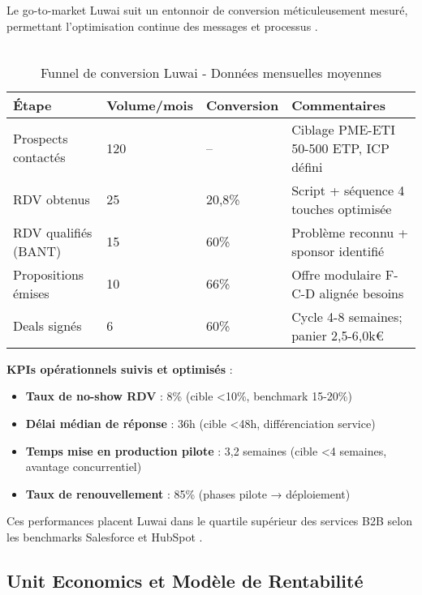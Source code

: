 Le go-to-market Luwai suit un entonnoir de conversion méticuleusement mesuré, permettant l'optimisation continue des messages et processus \cite{luwai2025funnel}.
\\\\
\begin{table}[ht]
\centering
\caption{Funnel de conversion Luwai - Données mensuelles moyennes}
\label{tab:luwai_funnel}
\begin{tabular}{@{}p{5cm}p{3cm}p{3cm}p{4cm}@{}}
\toprule
\textbf{Étape} & \textbf{Volume/mois} & \textbf{Conversion} & \textbf{Commentaires} \\
\midrule
Prospects contactés & 120 & -- & Ciblage PME-ETI 50-500 ETP, ICP défini \\
RDV obtenus & 25 & 20,8\% & Script + séquence 4 touches optimisée \\
RDV qualifiés (BANT) & 15 & 60\% & Problème reconnu + sponsor identifié \\
Propositions émises & 10 & 66\% & Offre modulaire F-C-D alignée besoins \\
Deals signés & 6 & 60\% & Cycle 4-8 semaines; panier 2,5-6,0k€ \\
\bottomrule
\end{tabular}
\end{table}
\medskip
\textbf{KPIs opérationnels suivis et optimisés} :
\begin{itemize}
    \item \textbf{Taux de no-show RDV} : 8\% (cible <10\%, benchmark 15-20\%)
    \item \textbf{Délai médian de réponse} : 36h (cible <48h, différenciation service)
    \item \textbf{Temps mise en production pilote} : 3,2 semaines (cible <4 semaines, avantage concurrentiel)
    \item \textbf{Taux de renouvellement} : 85\% (phases pilote → déploiement)
\end{itemize}
\medskip
Ces performances placent Luwai dans le quartile supérieur des services B2B selon les benchmarks Salesforce et HubSpot \cite{hubspot2024sales}.

\subsection{Unit Economics et Modèle de Rentabilité}

